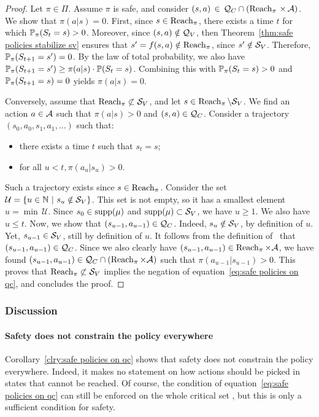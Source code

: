 \begin{proof}
	Let $\pi\in\Pi$. Assume $\pi$ is safe, and consider $(s, a)\,\in\, \QC \cap (\reach_\pi\,\times\,\A)$. We show that $\pi(a|s) = 0$. First, since $s\in\reach_\pi$, there exists a time $t$ for which $\P_\pi(S_t = s) > 0$. Moreover, since $(s, a) \notin \QV$, then Theorem~\ref{thm:safe policies stabilize sv} ensures that $s' = f(s, a)\notin\reach_\pi$, since $s'\notin\SV$. Therefore, $\P_\pi(S_{t+1} = s') = 0$. By the law of total probability, we also have $\P_\pi(S_{t+1} = s') \geq \pi(a|s)\cdot\P(S_t = s)$. Combining this with $\P_\pi(S_t = s) > 0$ and $\P_\pi(S_{t+1} = s) = 0$ yields $\pi(a|s) = 0$.\par
	Conversely, assume that $\reach_\pi\not\subset\SV$, and let $s\in\reach_\pi\setminus\SV$. We find an action $a\in\A$ such that $\pi(a|s) > 0$ and $(s, a) \in \QC$. Consider a trajectory $(s_0, a_0, s_1, a_1, \hdots)$ such that:
	\begin{itemize}
		\item there exists a time $t$ such that $s_t = s$;
		\item for all $u < t, \pi(a_u|s_u) > 0$.
	\end{itemize}
	Such a trajectory exists since $s\in\reach_\pi$. Consider the set \mbox{$\mathcal{U} = \{u\in\mathbb{N}~|~s_u\notin\SV\}$}. This set is not empty, so it has a smallest element $u = \min\,\mathcal{U}$. Since $s_0\in\support(\mu)$ and $\support(\mu)\subset\SV$, we have $u \geq 1$. We also have $u\leq t$. Now, we show that $(s_{u-1}, a_{u-1}) \in \QC$. Indeed, $s_u\notin\SV$, by definition of $u$. Yet, $s_{u-1}\in\SV$, still by definition of $u$. It follows from the definition of \QC~that $(s_{u-1}, a_{u-1})\in\QC$. Since we also clearly have $(s_{u-1}, a_{u-1})\in\reach_\pi \times \A$, we have found $(s_{u-1}, a_{u-1}) \in \QC\cap(\reach_\pi \times \A)$ such that $\pi(a_{u-1}|s_{u-1}) > 0$. This proves that $\reach_\pi\not\subset\SV$ implies the negation of equation~\eqref{eq:safe policies on qc}, and concludes the proof.
\end{proof}
\subsubsection{Discussion}
\paragraph{Safety does not constrain the policy everywhere} Corollary~\ref{clry:safe policies on qc} shows that safety does not constrain the policy everywhere. Indeed, it makes no statement on how actions should be picked in states that cannot be reached. Of course, the condition of equation~\eqref{eq:safe policies on qc} can still be enforced on the whole critical set \QC, but this is only a sufficient condition for safety.

